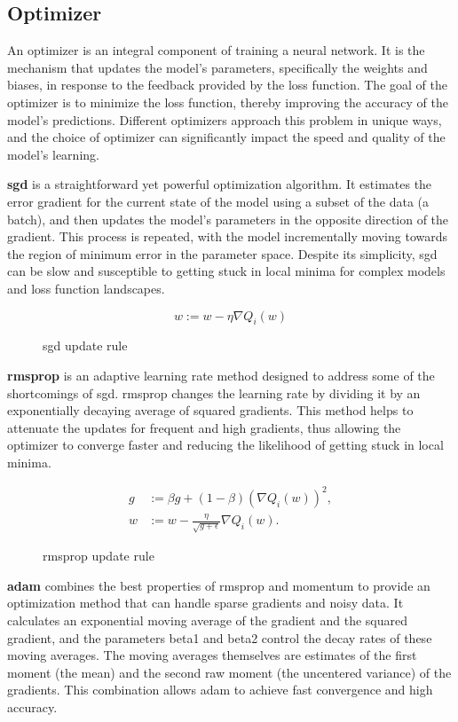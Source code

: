 \subsection{Optimizer}

An optimizer is an integral component of training a neural network. It is the
mechanism that updates the model's parameters, specifically the weights and
biases, in response to the feedback provided by the loss function. The goal of
the optimizer is to minimize the loss function, thereby improving the accuracy
of the model's predictions. Different optimizers approach this problem in
unique ways, and the choice of optimizer can significantly impact the speed and
quality of the model's learning.

\textbf{\gls{sgd}} is a straightforward yet powerful optimization
algorithm. It estimates the error gradient for the current state of the model
using a subset of the data (a batch), and then updates the model's parameters
in the opposite direction of the gradient. This process is repeated, with the
model incrementally moving towards the region of minimum error in the parameter
space. Despite its simplicity, \gls{sgd} can be slow and susceptible to getting stuck
in local minima for complex models and loss function landscapes.

\begin{figure}[H]
    \[ w := w - \eta\nabla Q_i(w) \]
    \caption{\gls{sgd} update rule}
\end{figure}

\textbf{\gls{rmsprop}} is an adaptive learning rate method
designed to address some of the shortcomings of \gls{sgd}. \gls{rmsprop} changes the
learning rate by dividing it by an exponentially decaying average of squared
gradients. This method helps to attenuate the updates for frequent and high
gradients, thus allowing the optimizer to converge faster and reducing the
likelihood of getting stuck in local minima.

\begin{figure}[H]
    \begin{align*}
        g & := \beta g + (1 - \beta) (\nabla Q_i(w))^2,            \\
        w & := w - \frac{\eta}{\sqrt{g + \epsilon}} \nabla Q_i(w).
    \end{align*}
    \caption{\gls{rmsprop} update rule}
\end{figure}

\textbf{\gls{adam}} combines the best properties of \gls{rmsprop} and
momentum to provide an optimization method that can handle sparse gradients and
noisy data. It calculates an exponential moving average of the gradient and the
squared gradient, and the parameters beta1 and beta2 control the decay rates of
these moving averages. The moving averages themselves are estimates of the
first moment (the mean) and the second raw moment (the uncentered variance) of
the gradients. This combination allows \gls{adam} to achieve fast convergence and
high accuracy.

